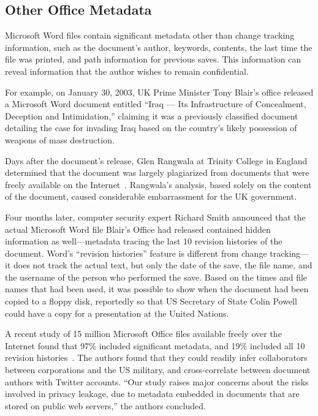\documentclass{article}
\begin{document}
\subsection{Other Office Metadata}

Microsoft Word files contain significant metadata other than change
tracking information, such as the document's author, keywords,
contents, the last time the file was printed, and path information for
previous saves. This information can reveal information that the
author wishes to remain confidential.

For example, on January 30, 2003,  UK Prime Minister Tony Blair's office released a Microsoft Word document entitled ``Iraq --- Its
Infrastructure of Concealment, Deception and Intimidation,'' claiming
it was a previously classified document detailing the case
for invading Iraq based on the country's likely possession of weapons
of mass destruction. 

Days after the document's release, Glen Rangwala at
Trinity College in England determined that the document was largely
plagiarized from documents that were freely available on the
Internet~\cite{rangwala-2003}.  Rangwala's analysis, based solely on
the content of the document, caused considerable embarrassment for the
UK government.

Four months later, computer security expert Richard Smith
announced that the actual Microsoft Word file Blair's Office had
released contained hidden information as well---metadata tracing the
last 10 revision histories of the document. Word's ``revision
histories'' feature is different from change tracking---it does not
track the actual text, but only the date of the save, the file name,
and the username of the person who performed the save. Based on the
times and file names that had been used, it was possible to show when
the document had been copied to a floppy
disk, reportedly so that US Secretary of State Colin Powell could have
a copy for a presentation at the United Nations\cite{smith-10}.

A recent study of 15 million Microsoft Office files available freely over the
Internet found that 97\% included significant metadata, and 19\%
included all 10 revision histories~\cite{6503202}. The authors found
that they could readily infer collaborators between corporations and
the US military, and cross-correlate between document authors with
Twitter accounts. ``Our study raises major concerns about the risks
involved in privacy leakage, due to metadata embedded in documents
that are stored on public web servers,'' the authors concluded.
\end{document}
